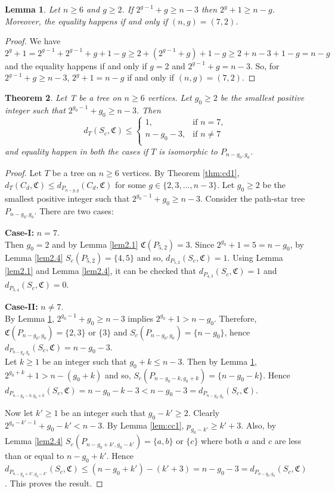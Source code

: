 \documentclass[11pt]{article}
\newtheorem{theorem}{Theorem}[section]
\newtheorem{lemma}[theorem]{Lemma}
\begin{document}
\begin{lemma}\label{lem:sc2}
Let $n\geq 6$ and $g\geq 2$.  If  $2^{g-1}+g \geq n-3$ then $2^{g}+1\geq n-g$. Moreover, the equality happens if and only if $(n,g)=(7,2)$.
\end{lemma}
\begin{proof}
We have $2^{g}+1=2^{g-1}+2^{g-1}+g+1-g \geq 2+(2^{g-1}+g)+1-g\geq 2+n-3+1-g = n-g$ and the equality happens if and only if  $g=2$ and $2^{g-1}+g = n-3$. So, for  $2^{g-1}+g \geq n-3$,  $2^{g}+1= n-g$ if and only if $(n,g)=(7,2)$.
\end{proof}
\begin{theorem}\label{thm:sc2}
Let T be a tree on $n\geq 6$ vertices. Let $g_0\geq 2$ be the smallest positive integer such that $2^{g_0-1}+g_0\geq n-3$. Then 
$$d_T(S_c,\mathfrak{C})\leq\left\{
\begin{array}{ll}
 1,  &\text{if $n=7$,}\\
 n-g_0-3, &\text{if $n\neq 7$}\\
\end{array}
\right.$$ 
 and equality happen in both the cases if $T$ is isomorphic to $P_{n-g_0,g_0}$.
\end{theorem}
\begin{proof}
Let $T$ be a tree on $n\geq 6$ vertices. By Theorem \ref{thm:cd1}, $d_T(C_d,\mathfrak{C})\leq d_{P_{n-g,g}}(C_d,\mathfrak{C})$ for some $g\in \{2,3,\ldots,n-3\}$.
Let $g_0\geq 2$ be the smallest positive integer such that $2^{g_0-1}+g_0\geq n-3$. Consider the path-star tree $P_{n-g_0,g_0}$. There are two cases:


\textbf{Case-I:} $n=7$.\\
Then $g_0=2$ and by Lemma \ref{lem2.1} $\mathfrak{C}(P_{5,2})=3$. Since $2^{g_0}+1=5=n-g_0$, by Lemma \ref{lem2.4} $S_c(P_{5,2})=\{4,5\}$ and so, $d_{P_{5,2}}(S_c, \mathfrak{C})=1$. Using Lemma \ref{lem2.1} and Lemma \ref{lem2.4}, it can be checked that $d_{P_{4,3}}(S_c, \mathfrak{C})=1$ and $d_{P_{3,4}}(S_c, \mathfrak{C})=0$.


\textbf{Case-II:} $n\neq 7$.\\
By Lemma \ref{lem:sc2},  $2^{g_0-1}+g_0 \geq n-3$  implies $2^{g_0}+1> n-g_0$. Therefore, $\mathfrak{C}(P_{n-g_0,g_0})=\{2,3\}$ or $\{3\}$ and $S_c(P_{n-g_0,g_0})=\{n-g_0\}$, hence $d_{P_{n-g_0,g_0}}(S_c, \mathfrak{C})=n-g_0-3$.\\

Let $k\geq 1$ be an integer such that $g_0+k\leq n-3$. Then by Lemma \ref{lem:sc2}, $2^{g_0+k}+1> n-(g_0+k)$ and so, $S_c(P_{n-g_0-k,g_0+k})=\{n-g_0-k\}$. Hence $d_{P_{n-g_0-k,g_0+k}}(S_c, \mathfrak{C})=n-g_0-k-3<n-g_0-3=d_{P_{n-g_0,g_0}}(S_c, \mathfrak{C})$.

Now let $k'\geq 1$ be an integer such that $g_0-k'\geq 2$. Clearly $2^{g_0-k'-1}+g_0-k'< n-3$. By Lemma \ref{lem:cc1}, $ p_{g_0-k'}\geq k'+3$. Also, by Lemma \ref{lem2.4} $S_c(P_{n-g_0+k',g_0-k'})=\{a,b\}$ or $\{c\}$ where both $a$ and $c$ are less than or equal to $n-g_0+k'$. Hence $d_{P_{n-g_0+k',g_0-k'}}(S_c, \mathfrak{C})\leq (n-g_0+k')-(k'+3)=n-g_0-3=d_{P_{n-g_0,g_0}}(S_c, \mathfrak{C})$. This proves the result.
\end{proof}
\end{document}
